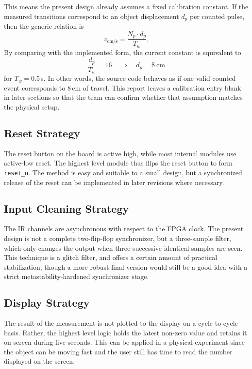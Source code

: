 \documentclass[conference,a4paper]{IEEEtran}
\begin{document}
This means the present design already assumes a fixed calibration constant. If the measured transitions correspond to an object displacement $d_p$ per counted pulse, then the generic relation is
\begin{equation}
v_{\text{cm/s}} = \frac{N_p \cdot d_p}{T_w}.
\end{equation}
By comparing with the implemented form, the current constant is equivalent to
\begin{equation}
\frac{d_p}{T_w} = 16 \quad \Rightarrow \quad d_p = 8\ \text{cm}
\end{equation}
for $T_w=0.5$\,s. In other words, the source code behaves as if one valid counted event corresponds to 8\,cm of travel. This report leaves a calibration entry blank in later sections so that the team can confirm whether that assumption matches the physical setup.

\subsection{Reset Strategy}
The reset button on the board is active high, while most internal modules use active-low reset. The highest level module thus flips the reset button to form \texttt{reset\_n}. The method is easy and suitable to a small design, but a synchronized release of the reset can be implemented in later revisions where necessary.

\subsection{Input Cleaning Strategy}
The IR channels are asynchronous with respect to the FPGA clock. The present design is not a complete two-flip-flop synchronizer, but a three-sample filter, which only changes the output when three successive identical samples are seen. This technique is a glitch filter, and offers a certain amount of practical stabilization, though a more robust final version would still be a good idea with a strict metastability-hardened synchronizer stage.

\subsection{Display Strategy}
The result of the measurement is not plotted to the display on a cycle-to-cycle basis. Rather, the highest level logic holds the latest non-zero value and retains it on-screen during five seconds. This can be applied in a physical experiment since the object can be moving fast and the user still has time to read the number displayed on the screen.
\end{document}
